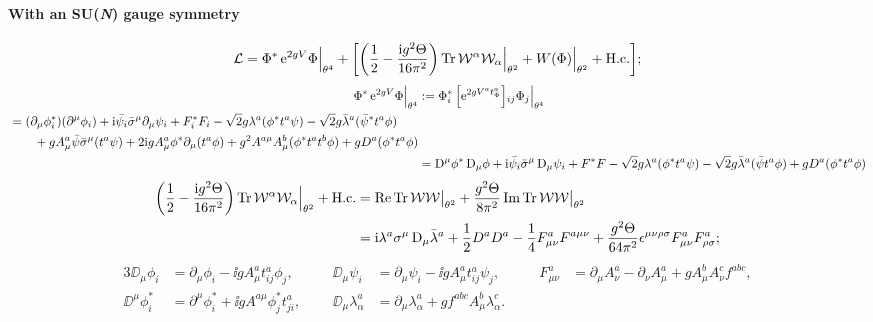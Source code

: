 \documentclass[CheatSheet]{subfiles}
\begin{document}
\newpage

\paragraph{With an SU({\itshape N}) gauge symmetry}
\begin{equation}
   \mathcal L =
\Phi^* \mathop{}\!\mathrm{e}^{2gV}\Phi\Big|_{\theta^4}
+
\biggl[
\left(\frac12 - \frac{\mathrm{i} g^2\Theta}{16\pi^2}\right)
\operatorname{\mathrm{Tr}}\mathcal W^\alpha\mathcal W_\alpha\Big|_{\theta^2} +
W(\Phi)\Big|_{\theta^2} + \text{H.c.}
\biggr];
\end{equation}\vskip-18pt
\begin{align}
 \Phi^*\mathop{}\!\mathrm{e}^{2g V}\Phi\Big|_{\theta^4}
&:=\Phi^*_i\left[\mathop{}\!\mathrm{e}^{2g V^a t^a_\Phi}\right]{\!}_{ij}\Phi_j\Big|_{\theta^4}
\\
\begin{split}
 &=
 (\partial_{\mu}\phi_i^*)(\partial^{\mu}\phi_i)+\mathrm{i}\bar{\psi_i}\bar\sigma^\mu\partial_{\mu}\psi_i
+F_i^*F_i
 -\sqrt{2}g\lambda^a (\phi^*t^a\psi)
 -\sqrt{2}g\bar\lambda^a(\bar\psi^*t^a\phi)
 \\&\qquad
 + g A^a_{\mu}\bar\psi\bar\sigma^\mu(t^a\psi)
 + 2\mathrm{i} gA^a_{\mu}\phi^*\partial_{\mu}(t^a\phi)
 +g^2A^{a\mu}A^b_\mu(\phi^*t^at^b\phi)
 + gD^a(\phi^*t^a\phi)
\end{split}
\\&=
\mathop{}\!\mathrm{D}^\mu\phi^*\mathop{}\!\mathrm{D}_\mu\phi
+\mathrm{i}\bar{\psi_i}\bar\sigma^\mu\mathop{}\!\mathrm{D}_{\mu}\psi_i + F^*F
 -\sqrt{2}g\lambda^a (\phi^*t^a\psi)
 -\sqrt{2}g\bar\lambda^a(\bar\psi t^a\phi)
 + gD^a(\phi^*t^a\phi)
\end{align}\vskip-18pt
\begin{equation}
\begin{split}
  \left(\frac12 - \frac{\mathrm{i} g^2\Theta}{16\pi^2}\right)\operatorname{\mathrm{Tr}}
 \mathcal W^\alpha\mathcal W_\alpha\Big|_{\theta^2}+\text{H.c.}
 &= \mathop{\mathrm{Re}}\operatorname{\mathrm{Tr}}\mathcal W\mathcal W\big|_{\theta^2}
 + \frac{g^2\Theta}{8\pi^2}\mathop{\mathrm{Im}}\operatorname{\mathrm{Tr}}\mathcal W\mathcal W\big|_{\theta^2}\\
&=
\mathrm{i}\lambda^a\sigma^{\mu}\mathop{}\!\mathrm{D}_{\mu}\bar{\lambda}^a
+\frac12D^a D^a
-\frac14F^a_{\mu\nu}F^{a\mu\nu}
+\frac{g^2\Theta}{64\pi^2}\epsilon^{\mu \nu\rho\sigma}
F^a_{\mu\nu}F^a_{\rho\sigma};
\end{split}
\end{equation}\vskip-18pt
\begin{alignat*}{3}
 \DD_{\mu}\phi_i&=\partial_\mu\phi_i-\ii g A^a_\mu t^a_{ij}\phi_j, \qquad&
  \DD_{\mu}\psi_i&=\partial_\mu\psi_i-\ii g A^a_\mu t^a_{ij}\psi_j, \qquad&
  F^a_{\mu\nu}&=\partial_{\mu}A_\nu^a-\partial_{\nu}A_\mu^a+g A_\mu^b A_\nu^c f^{abc},\\
\DD^{\mu}\phi_i^*&=\partial^\mu\phi_i^*+\ii g A^{a\mu}\phi_j^*t^a_{ji},&
\DD_\mu\lambda^a_\alpha&=\partial_{\mu}\lambda^{a}_\alpha+g f^{abc}A_\mu^{b}\lambda^{c}_\alpha.
\end{alignat*}
\end{document}
